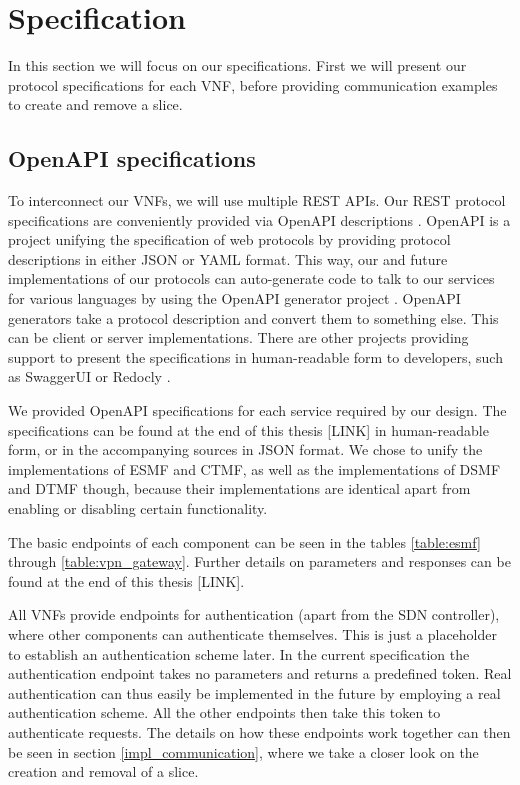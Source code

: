 \section{Specification}
\label{impl_specification}
In this section we will focus on our specifications. First we will present our protocol specifications for each VNF, before providing communication examples to create and remove a slice.

\subsection{OpenAPI specifications}
To interconnect our VNFs, we will use multiple REST APIs. Our REST protocol specifications are conveniently provided via OpenAPI descriptions \cite{openapi}. OpenAPI is a project unifying the specification of web protocols by providing protocol descriptions in either JSON or YAML format. This way, our and future implementations of our protocols can auto-generate code to talk to our services for various languages by using the OpenAPI generator project \cite{openapi-generator}. OpenAPI generators take a protocol description and convert them to something else. This can be client or server implementations. There are other projects providing support to present the specifications in human-readable form to developers, such as SwaggerUI \cite{swaggerui} or Redocly \cite{redocly}.

We provided OpenAPI specifications for each service required by our design. The specifications can be found at the end of this thesis [LINK] in human-readable form, or in the accompanying sources in JSON format. We chose to unify the implementations of ESMF and CTMF, as well as the implementations of DSMF and DTMF though, because their implementations are identical apart from enabling or disabling certain functionality.

The basic endpoints of each component can be seen in the tables \ref{table:esmf} through \ref{table:vpn_gateway}. Further details on parameters and responses can be found at the end of this thesis [LINK].

All VNFs provide endpoints for authentication (apart from the SDN controller), where other components can authenticate themselves. This is just a placeholder to establish an authentication scheme later. In the current specification the authentication endpoint takes no parameters and returns a predefined token. Real authentication can thus easily be implemented in the future by employing a real authentication scheme. All the other endpoints then take this token to authenticate requests. The details on how these endpoints work together can then be seen in section \ref{impl_communication}, where we take a closer look on the creation and removal of a slice.

